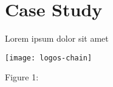 \section{Case Study}
Lorem ipsum dolor sit amet

\begin{center}
	\texttt{[image: logos-chain]}
\end{center}
\begin{center}
	Figure 1: 
\end{center}